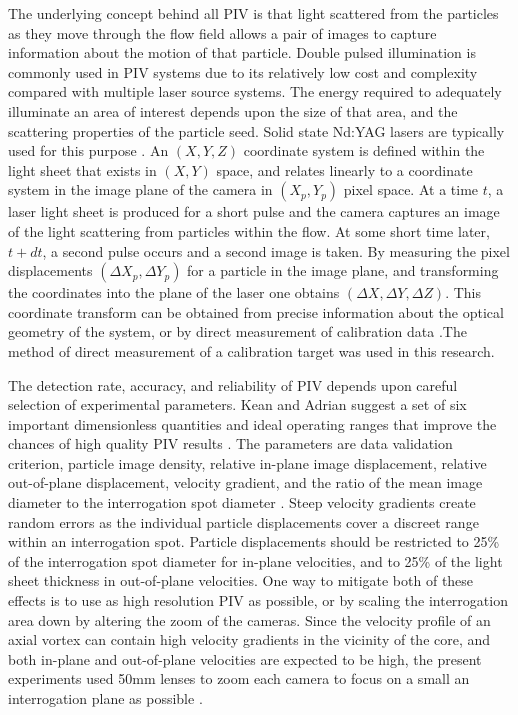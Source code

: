 The 
underlying concept behind all PIV is that light scattered from the particles as 
they move through the flow field allows a pair of images to capture information 
about the motion of that particle. Double pulsed illumination is commonly used 
in PIV systems due to its relatively low cost and complexity compared with 
multiple laser source systems. The energy required to adequately illuminate an 
area of interest depends upon the size of that area, and the scattering 
properties of the particle seed. Solid state Nd:YAG lasers are typically used 
for this purpose \cite{adrian2011}. An $(X, Y, Z)$ coordinate system 
is defined 
within the light sheet that exists in $(X, Y)$ space, and relates linearly to a 
coordinate system in the image plane of the camera in $(X_p, Y_p)$ pixel space. 
At a time $t$, a laser light sheet is produced for a short pulse and the camera 
captures an image of the light scattering from particles within the flow. At 
some short time later, $t + dt$, a second pulse occurs and a second image is 
taken. By measuring the pixel displacements $(\Delta X_p, \Delta 
Y_p)$ for a particle in the image plane, and transforming the coordinates into 
the plane of the laser one obtains $(\Delta X, \Delta Y, \Delta Z)$. This 
coordinate transform can be obtained from precise information about the optical 
geometry of the system, or by direct measurement of calibration data 
\cite{fouras2007}.The method of direct measurement of a calibration target was 
used in this research. 

The detection rate, accuracy, and reliability of PIV depends upon careful 
selection of experimental parameters. Kean and Adrian suggest a set of six 
important dimensionless quantities and ideal operating ranges that improve the 
chances of high quality PIV results . The parameters 
are data validation criterion, particle image density, relative in-plane image 
displacement, relative out-of-plane displacement, velocity gradient, and the 
ratio of the mean image diameter to the interrogation spot diameter 
\cite{keane1990,lawson1997b}. Steep velocity gradients create random 
errors as the 
individual particle displacements cover a discreet range within an 
interrogation spot. Particle displacements should be restricted to 25\% of the 
interrogation spot diameter for in-plane velocities, and to 25\% of the light 
sheet thickness in out-of-plane velocities. One way to mitigate both of these 
effects is to use as high resolution PIV as possible, or by scaling the 
interrogation area down by altering the zoom of the cameras. Since the velocity 
profile of an axial vortex can contain high velocity gradients in the vicinity 
of the core, and both in-plane and out-of-plane velocities are expected to be 
high, the present experiments used 50mm lenses to zoom each camera to 
focus on a small an interrogation plane as possible \cite{prasad1992}.

